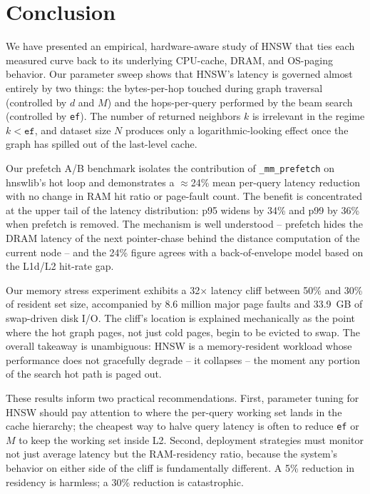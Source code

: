 \documentclass[conference]{IEEEtran}
\begin{document}
\section{Conclusion}
\label{sec:concl}
We have presented an empirical, hardware-aware study of HNSW that ties
each measured curve back to its underlying CPU-cache, DRAM, and OS-paging
behavior. Our parameter sweep shows that HNSW's latency is governed almost
entirely by two things: the bytes-per-hop touched during graph traversal
(controlled by $d$ and $M$) and the hops-per-query performed by the beam
search (controlled by \texttt{ef}). The number of returned neighbors $k$
is irrelevant in the regime $k < \texttt{ef}$, and dataset size $N$
produces only a logarithmic-looking effect once the graph has spilled out
of the last-level cache.

Our prefetch A/B benchmark isolates the contribution of
\texttt{\_mm\_prefetch} on hnswlib's hot loop and demonstrates a
$\approx$24\% mean per-query latency reduction with no change in RAM
hit ratio or page-fault count. The benefit is concentrated at the upper
tail of the latency distribution: p95 widens by 34\% and p99 by 36\%
when prefetch is removed. The mechanism is well understood -- prefetch
hides the DRAM latency of the next pointer-chase behind the distance
computation of the current node -- and the 24\% figure agrees with a
back-of-envelope model based on the L1d/L2 hit-rate gap.

Our memory stress experiment exhibits a 32$\times$ latency cliff between
50\% and 30\% of resident set size, accompanied by 8.6 million major page
faults and 33.9~GB of swap-driven disk I/O. The cliff's location is
explained mechanically as the point where the hot graph pages, not just
cold pages, begin to be evicted to swap. The overall takeaway is
unambiguous: HNSW is a memory-resident workload whose performance does not
gracefully degrade -- it collapses -- the moment any portion of the search
hot path is paged out.

These results inform two practical recommendations. First, parameter tuning
for HNSW should pay attention to where the per-query working set lands in
the cache hierarchy; the cheapest way to halve query latency is often to
reduce \texttt{ef} or $M$ to keep the working set inside L2. Second,
deployment strategies must monitor not just average latency but the
RAM-residency ratio, because the system's behavior on either side of the
cliff is fundamentally different. A 5\% reduction in residency is harmless;
a 30\% reduction is catastrophic.
\end{document}
